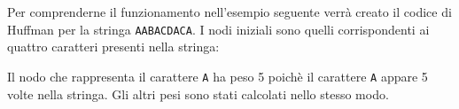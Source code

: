 Per comprenderne il funzionamento nell'esempio seguente
verrà creato il codice di Huffman per la stringa
\texttt{AABACDACA}.
I nodi iniziali sono quelli corrispondenti ai quattro
caratteri presenti nella stringa:

\begin{center}
\end{center}

Il nodo che rappresenta il carattere \texttt{A}
ha peso 5 poichè il carattere \texttt{A}
appare 5 volte nella stringa.
Gli altri pesi sono stati calcolati nello 
stesso modo.

